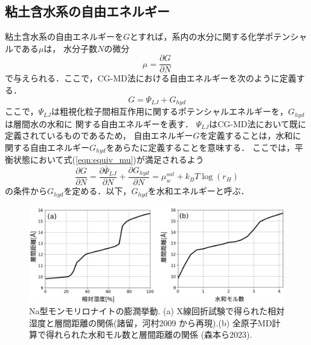 \subsection{粘土含水系の自由エネルギー}
粘土含水系の自由エネルギーを$G$とすれば，系内の水分に関する化学ポテンシャルである$\mu$は，
水分子数$N$の微分
\begin{equation}
	\mu=\frac{\partial G}{\partial N}
	\label{eqn:mu_GN}
\end{equation}
で与えられる．ここで，CG-MD法における自由エネルギーを次のように定義する．
\begin{equation}
	G=\Psi_{LJ}+G_{hyd}
	\label{eqn:Gtot}
\end{equation}
ここで，$\Psi_{LJ}$は粗視化粒子間相互作用に関するポテンシャルエネルギーを，$G_{hyd}$は層間水の水和に
関する自由エネルギーを表す．
$\Psi_{LJ}$はCG-MD法において既に定義されているものであるため，
自由エネルギー$G$を定義することは，水和に関する自由エネルギー$G_{hyd}$をあらたに定義することを意味する．
ここでは，平衡状態において式(\ref{eqn:equiv_mu})が満足されるよう
\begin{equation}
	\frac{\partial G}{\partial N}
	=
	\frac{\partial \bar{\Psi}_{LJ}}{\partial N}
	+
	\frac{\partial G_{hyd}}{\partial N}
	=
	\mu_w^{sat} +k_BT \log
	\left(
		r_H
	\right)
	\label{eqn:equiv_rH}
\end{equation}
の条件から$G_{hyd}$を定める．以下，$G_{hyd}$を水和エネルギーと呼ぶ．
\begin{figure}[h]
	\begin{center}
	\includegraphics[width=1.0\linewidth]{Figs/fig1.pdf} 
	\end{center}
	\caption{
		Na型モンモリロナイトの膨潤挙動.
		(a) X線回折試験で得られた相対湿度と層間距離の関係(諸留，河村2009\cite{Morodome}
		から再現).(b) 全原子MD計算で得れられた水和モル数と層間距離の関係
		(森本ら2023\cite{Morimoto}). 
	} 
	\label{fig:fig1}
\end{figure}
